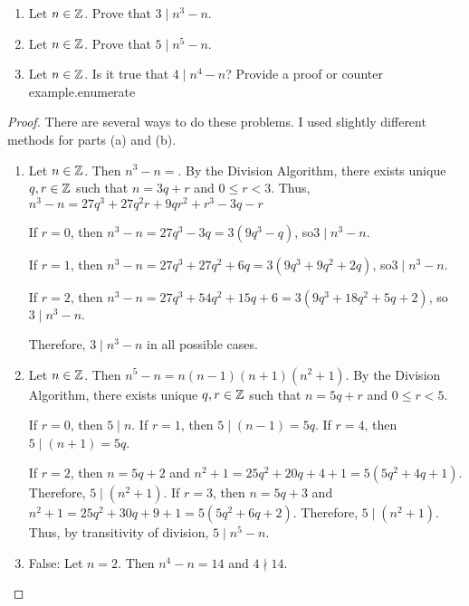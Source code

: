 \documentclass[letterpaper, 11 pt]{../ximera}
\begin{document}
\begin{problem}\label{ch1-ex10}%
%
    \begin{enumerate}[label=(\alph*)]
            \item Let \(n\in\mathbb Z\). Prove that \(3\mid n^3-n\).%
            \item Let \(n\in\mathbb Z\). Prove that \(5\mid n^5-n\).%
            \item Let \(n\in\mathbb Z\). Is it true that \(4\mid n^4-n\)? Provide a proof or counter example.enumerate%
    \end{enumerate}
%
    \begin{proof}
    There are several ways to do these problems. I used slightly different methods for parts (a) and (b).%
        \begin{enumerate}[label=(\alph*)]
            \item Let \(n\in\mathbb Z\). Then \(n^3-n=\). By the Division Algorithm, there exists unique \(q,r\in\mathbb Z\) such that \(n=3q+r\) and \(0\leq r<3\).  Thus, \(n^3-n=27q^3+27q^2r+9qr^2+r^3-3q-r\)%

            If \(r=0\), then \(n^3-n=27q^3-3q=3(9q^3-q)\), so\(3\mid n^3-n.\)%

            If \(r=1\), then \(n^3-n=27q^3+27q^2+6q=3(9q^3+9q^2+2q)\), so\(3\mid n^3-n.\)%

            If \(r=2\), then \(n^3-n=27q^3+54q^2+15q+6=3(9q^3+18q^2+5q+2)\), so\(3\mid n^3-n.\)%

            Therefore, \(3\mid n^3-n\) in all possible cases.%
            
            \item Let \(n\in\mathbb Z\). Then \(n^5-n=n(n-1)(n+1)(n^2+1)\). By the Division Algorithm, there exists unique \(q,r\in\mathbb Z\) such that \(n=5q+r\) and \(0\leq r<5\).%

            If \(r=0\), then \(5\mid n.\) If \(r=1\), then \(5\mid (n-1)=5q\). If \(r=4\), then \(5\mid (n+1)=5q\).%

            If \(r=2\), then \(n=5q+2\) and \(n^2+1=25q^2+20q+4+1=5(5q^2+4q+1)\). Therefore, \(5\mid (n^2+1)\). If \(r=3\), then \(n=5q+3\) and \(n^2+1=25q^2+30q+9+1=5(5q^2+6q+2)\). Therefore, \(5\mid (n^2+1)\). Thus, by transitivity of division, \(5\mid n^5-n\).%
            
            \item False: Let \(n=2\). Then \(n^4-n=14\) and \(4\nmid 14\).%
        \end{enumerate}
%
    \end{proof}



\end{problem}
\end{document}
